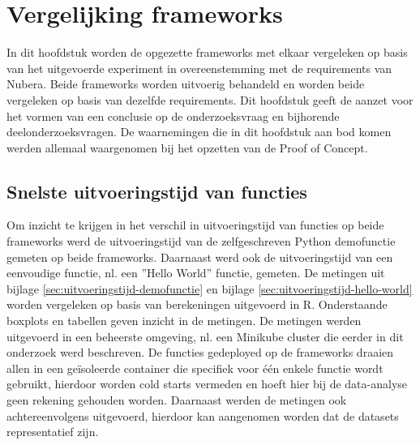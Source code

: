 \chapter{Vergelijking frameworks}
\label{ch:vergelijking-frameworks}
In dit hoofdstuk worden de opgezette frameworks met elkaar vergeleken op basis van het uitgevoerde experiment in overeenstemming met de requirements van Nubera. Beide frameworks worden uitvoerig behandeld en worden beide vergeleken op basis van dezelfde requirements. Dit hoofdstuk geeft de aanzet voor het vormen van een conclusie op de onderzoeksvraag en bijhorende deelonderzoeksvragen. De waarnemingen die in dit hoofdstuk aan bod komen werden allemaal waargenomen bij het opzetten van de Proof of Concept.

\section{Snelste uitvoeringstijd van functies}
\label{sec:vergelijking-uitvoeringstijd}
Om inzicht te krijgen in het verschil in uitvoeringstijd van functies op beide frameworks werd de uitvoeringstijd van de zelfgeschreven Python demofunctie gemeten op beide frameworks. Daarnaast werd ook de uitvoeringstijd van een eenvoudige functie, nl. een ''Hello World'' functie, gemeten. De metingen uit bijlage \ref{sec:uitvoeringstijd-demofunctie} en bijlage \ref{sec:uitvoeringstijd-hello-world} worden vergeleken op basis van  berekeningen uitgevoerd in R. Onderstaande boxplots en tabellen geven inzicht in de metingen. De metingen werden uitgevoerd in een beheerste omgeving, nl. een Minikube cluster die eerder in dit onderzoek werd beschreven. De functies gedeployed op de frameworks draaien allen in een geïsoleerde container die specifiek voor één enkele functie wordt gebruikt, hierdoor worden cold starts vermeden en hoeft hier bij de data-analyse geen rekening gehouden worden. Daarnaast werden de metingen ook achtereenvolgens uitgevoerd, hierdoor kan aangenomen worden dat de datasets representatief zijn.

\newpage
